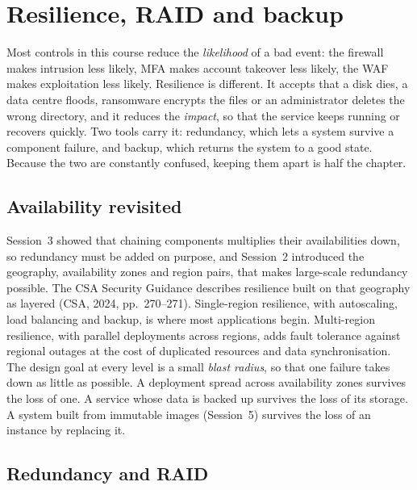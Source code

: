 \chapter{Resilience, RAID and backup}

Most controls in this course reduce the \emph{likelihood} of a bad event:
the firewall makes intrusion less likely, MFA makes account takeover less
likely, the WAF makes exploitation less likely. Resilience is different. It
accepts that a disk dies, a data centre floods, ransomware encrypts the
files or an administrator deletes the wrong directory, and it reduces the
\emph{impact}, so that the service keeps running or recovers quickly. Two
tools carry it: redundancy, which lets a system survive a component
failure, and backup, which returns the system to a good state. Because the
two are constantly confused, keeping them apart is half the chapter.

\section{Availability revisited}

Session~3 showed that chaining components multiplies their availabilities
down, so redundancy must be added on purpose, and Session~2 introduced the
geography, availability zones and region pairs, that makes large-scale
redundancy possible. The CSA Security Guidance describes resilience built on
that geography as layered (CSA, 2024, pp.~270--271). Single-region
resilience, with autoscaling, load balancing and backup, is where most
applications begin. Multi-region resilience, with parallel deployments
across regions, adds fault tolerance against regional outages at the cost
of duplicated resources and data synchronisation. The design goal at every
level is a small \emph{blast radius}, so that one failure takes down as
little as possible. A deployment spread across availability zones survives
the loss of one. A service whose data is backed up survives the loss of its
storage. A system built from immutable images (Session~5) survives the loss
of an instance by replacing it.

\section{Redundancy and RAID}

